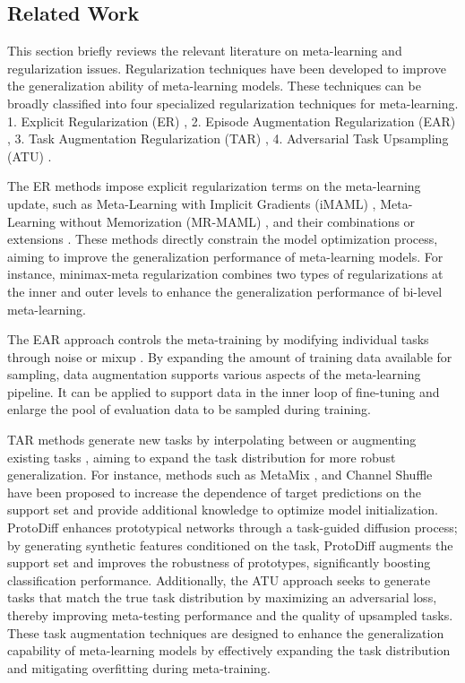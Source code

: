 \subsection{Related Work}


This section briefly reviews the relevant literature on meta-learning and regularization issues. Regularization techniques have been developed to improve the generalization ability of meta-learning models. These techniques can be broadly classified into four specialized regularization techniques for meta-learning. 1. Explicit Regularization (ER) \cite{rajeswaran2019imaml,mrmaml,pan2021meta,wang2023improving}, 2. Episode Augmentation Regularization (EAR) \cite{yamaguchi2023regularizing, shu2023dac}, 3. Task Augmentation Regularization (TAR) \cite{yao2021meta,yao2021improving,rajendran2020meta}, 4. Adversarial Task Upsampling (ATU) \cite{wu2022adversarial}. 

The ER methods impose explicit regularization terms on the meta-learning update, such as Meta-Learning with Implicit Gradients (iMAML) \cite{rajeswaran2019imaml}, Meta-Learning without Memorization (MR-MAML) \cite{mrmaml}, and their combinations or extensions \cite{pan2021meta, wang2023improving}. These methods directly constrain the model optimization process, aiming to improve the generalization performance of meta-learning models. For instance, minimax-meta regularization \cite{wang2023improving}
combines two types of regularizations at the inner and outer levels to enhance the generalization performance of bi-level meta-learning.

The EAR approach controls the meta-training by modifying individual tasks through noise or mixup \cite{yamaguchi2023regularizing, shu2023dac}. By expanding the amount of training data available for sampling, data augmentation supports various aspects of the meta-learning pipeline. It can be applied to support data in the inner loop of fine-tuning and enlarge the pool of evaluation data to be sampled during training. 

TAR methods generate new tasks by interpolating between or augmenting existing tasks \cite{yao2021meta, rajendran2020meta}, aiming to expand the task distribution for more robust generalization. For instance, methods such as MetaMix \cite{chen2021metamix}, and Channel Shuffle \cite{yao2021improving} have been proposed to increase the dependence of target predictions on the support set and provide additional knowledge to optimize model initialization. ProtoDiff \cite{du2023protodiff} enhances prototypical networks through a task-guided diffusion process; by generating synthetic features conditioned on the task, ProtoDiff \cite{du2023protodiff} augments the support set and improves the robustness of prototypes, significantly boosting classification performance. Additionally, the ATU approach \cite{wu2022adversarial} seeks to generate tasks that match the true task distribution by maximizing an adversarial loss, thereby improving meta-testing performance and the quality of upsampled tasks. These task augmentation techniques are designed to enhance the generalization capability of meta-learning models by effectively expanding the task distribution and mitigating overfitting during meta-training.

